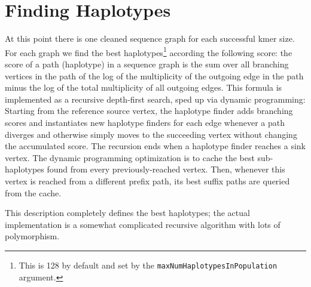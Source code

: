\documentclass[nofootinbib,amssymb,amsmath]{revtex4}
\newcommand{\code}[1]{\texttt{#1}}
\begin{document}
\section{Finding Haplotypes} \label{finding-haplotypes}
At this point there is one cleaned sequence graph for each successful kmer size.  For each graph we find the best haplotypes\footnote{This is 128 by default and set by the \code{maxNumHaplotypesInPopulation} argument.} according the following score: the score of a path (haplotype) in a sequence graph is the sum over all branching vertices in the path of the log of the multiplicity of the outgoing edge in the path minus the log of the total multiplicity of all outgoing edges.  This formula is implemented as a recursive depth-first search, sped up via dynamic programming: Starting from the reference source vertex, the haplotype finder adds branching scores and instantiates new haplotype finders for each edge whenever a path diverges and otherwise simply moves to the succeeding vertex without changing the accumulated score.  The recursion ends when a haplotype finder reaches a sink vertex.  The dynamic programming optimization is to cache the best sub-haplotypes found from every previously-reached vertex.  Then, whenever this vertex is reached from a different prefix path, its best suffix paths are queried from the cache.


This description completely defines the best haplotypes; the actual implementation is a somewhat complicated recursive algorithm with lots of polymorphism.
\end{document}
